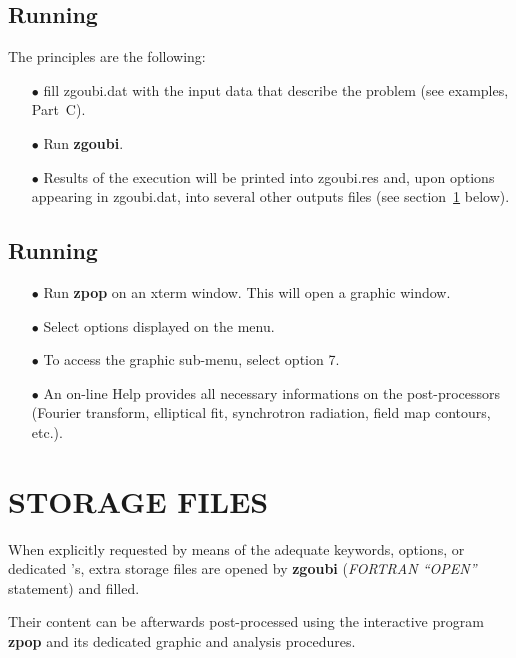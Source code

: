 \subsection{Running \zgoubi} 

The principles are the following:
\begin{itemize}
\item[$\bullet$] fill zgoubi.dat    with the input data that describe the 
problem (see examples, Part~C). 
\item[$\bullet$] Run  \textbf{zgoubi}. 
\item[$\bullet$] Results of the execution will be printed into  
zgoubi.res  and, upon options appearing in zgoubi.dat,
 into several other outputs files (see section~\ref{secD-3} below).  
\end{itemize}

\subsection{Running \zpop} 

\begin{itemize}
\item[$\bullet$] Run \textbf{zpop} on an xterm window. This will open a 
graphic window. 
\item[$\bullet$] Select options displayed on the menu.   
\item[$\bullet$] To access the graphic sub-menu, select option 7. 
\item[$\bullet$] An on-line Help provides all necessary informations 
on the post-processors (Fourier transform, elliptical fit, synchrotron 
radiation, field map contours, etc.).
\end{itemize}

\section{STORAGE FILES} \label{secD-3}

When explicitly requested by means of the adequate keywords,  options, or dedicated 
\LABEL's, extra storage files are opened by \textbf{zgoubi} 
(\textsl{FORTRAN ``OPEN''} statement) and filled. 

Their content can be  afterwards  post-processed using the interactive program \textbf{zpop} and its dedicated graphic 
and analysis procedures. 

\bigskip

